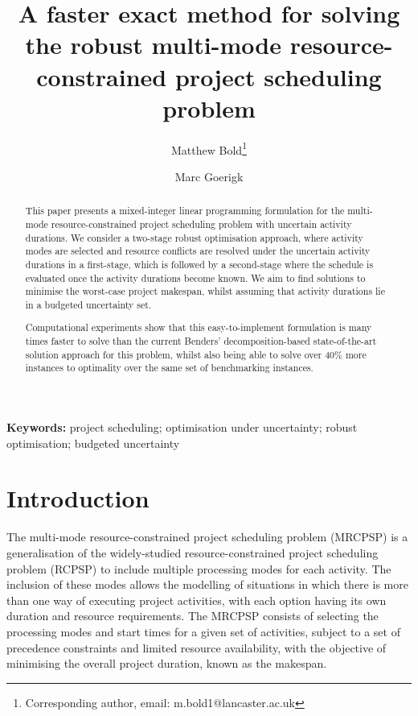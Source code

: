 \documentclass[a4paper,abstracton]{scrartcl}
\begin{document}
\title{A faster exact method for solving the robust multi-mode resource-constrained project scheduling problem}

\author[1]{Matthew Bold\footnote{Corresponding author, email: m.bold1@lancaster.ac.uk}}
\author[2]{Marc Goerigk}

\date{}

\maketitle

\begin{abstract}
	This paper presents a mixed-integer linear programming formulation for the multi-mode resource-constrained project scheduling problem with uncertain activity durations. We consider a two-stage robust optimisation approach, where activity modes are selected and resource conflicts are resolved under the uncertain activity durations in a first-stage, which is followed by a second-stage where the schedule is evaluated once the activity durations become known. We aim to find solutions to minimise the worst-case project makespan, whilst assuming that activity durations lie in a budgeted uncertainty set.

Computational experiments show that this easy-to-implement formulation is many times faster to solve than the current Benders' decomposition-based state-of-the-art solution approach for this problem, whilst also being able to solve over 40\% more instances to optimality over the same set of benchmarking instances.
\end{abstract}

\noindent\textbf{Keywords:} project scheduling; optimisation under uncertainty; robust optimisation; budgeted uncertainty


\section{Introduction}
The multi-mode resource-constrained project scheduling problem (MRCPSP) is a generalisation of the widely-studied resource-constrained project scheduling problem (RCPSP) to include multiple processing modes for each activity. The inclusion of these modes allows the modelling of situations in which there is more than one way of executing project activities, with each option having its own duration and resource requirements. The MRCPSP consists of selecting the processing modes and start times for a given set of activities, subject to a set of precedence constraints and limited resource availability, with the objective of minimising the overall project duration, known as the makespan.
\end{document}
